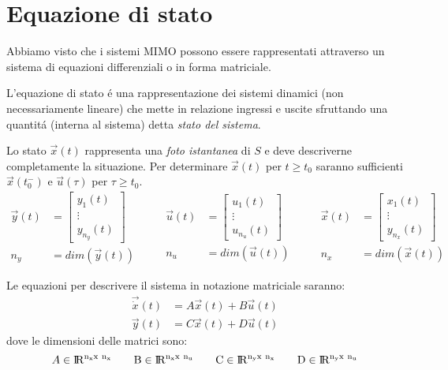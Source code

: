 \documentclass[../main.tex]{subfiles}
\begin{document}
	\section{Equazione di stato}
		Abbiamo visto che i sistemi MIMO possono essere rappresentati attraverso un sistema di equazioni differenziali o in forma matriciale.
		\begin{center}
			\begin{minipage}{.9\linewidth}
				L'equazione di stato \'e una rappresentazione dei sistemi dinamici (non necessariamente lineare) che mette in relazione ingressi e uscite sfruttando una quantit\'a (interna al sistema) detta \textit{stato del sistema}.
			\end{minipage}
		\end{center}
		Lo stato $ \vec{x}(t) $ rappresenta una \textit{foto istantanea} di $ S $ e deve descriverne completamente la situazione. Per determinare $ \vec{x}(t) $ per $ t \geq t_0 $ saranno sufficienti $ \vec{x}(t^-_0) $ e $ \vec u(\tau) $ per $ \tau \geq t_0 $.
		\[
			\begin{aligned}
				\vec{y}(t) &=
				\begin{bmatrix}
					y_1(t)
					\\ \vdots \\
					y_{n_y}(t)
				\end{bmatrix}
				\\
				n_y &= dim(\vec{y}(t))
			\end{aligned}
			\qquad
			\begin{aligned}
				\vec{u}(t) &=
				\begin{bmatrix}
					u_1(t)
					\\ \vdots \\
					u_{n_u}(t)
				\end{bmatrix}
				\\
				n_u &= dim(\vec{u}(t))
			\end{aligned}
			\qquad
			\begin{aligned}
				\vec{x}(t) &=
				\begin{bmatrix}
					x_1(t)
					\\ \vdots \\
					y_{n_x}(t)
				\end{bmatrix}
				\\
				n_x &= dim(\vec{x}(t))
			\end{aligned}
		\]
		
		Le equazioni per descrivere il sistema in notazione matriciale saranno:
		\begin{align*}
			\vec{\dot{x}}(t) &= A \vec{x}(t) + B \vec{u}(t)
			\\
			\vec{y}(t) &= C \vec{x}(t) + D \vec{u}(t)
		\end{align*}
		dove le dimensioni delle matrici sono:
		\[
			A \in \rm I\!R^{n_x x\ n_x} \qquad B \in \rm I\!R^{n_x x\ n_u} \qquad C \in \rm I\!R^{n_y x\ n_x} \qquad D \in \rm I\!R^{n_y x\ n_u}
		\]
		
\end{document}
